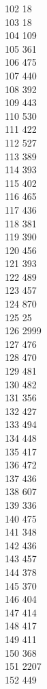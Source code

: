 { 102	18 \\
 103	18 \\
 104	109 \\
 105	361 \\
 106	475 \\
 107	440 \\
 108	392 \\
 109	443 \\
 110	530 \\
 111	422 \\
 112	527 \\
 113	389 \\
 114	393 \\
 115	402 \\
 116	465 \\
 117	436 \\
 118	381 \\
 119	390 \\
 120	456 \\
 121	393 \\
 122	489 \\
 123	457 \\
 124	870 \\
 125	25 \\
 126	2999 \\
 127	476 \\
 128	470 \\
 129	481 \\
 130	482 \\
 131	356 \\
 132	427 \\
 133	494 \\
 134	448 \\
 135	417 \\
 136	472 \\
 137	436 \\
 138	607 \\
 139	336 \\
 140	475 \\
 141	348 \\
 142	436 \\
 143	457 \\
 144	378 \\
 145	370 \\
 146	404 \\
 147	414 \\
 148	417 \\
 149	411 \\
 150	368 \\
 151	2207 \\
 152	449 \\
}
